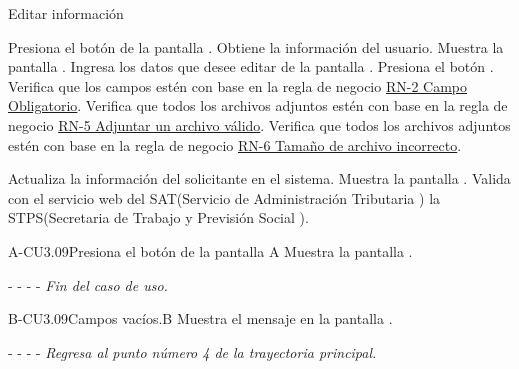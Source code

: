 	\begin{UCtrayectoria}{Editar información }

        \UCpaso[\UCactor]Presiona el botón  de la pantalla .
        \UCpaso[\UCsist] Obtiene la información del usuario.
		\UCpaso[\UCsist] Muestra la pantalla . 
		\UCpaso[\UCactor] Ingresa los datos que desee editar de la pantalla .
		\UCpaso[\UCactor] Presiona el botón . 
		\UCpaso[\UCsist] Verifica que los campos estén con base en la regla de negocio \hyperlink{RN2}{RN-2 Campo Obligatorio}. 
	    \UCpaso[\UCsist] Verifica que todos los archivos adjuntos estén con base en la regla de negocio \hyperlink{RN5}{RN-5 Adjuntar un archivo válido}. 
	    \UCpaso[\UCsist] Verifica que todos los archivos adjuntos estén con base en la regla de negocio \hyperlink{RN6}{RN-6 Tamaño de archivo incorrecto}. 
		
        \UCpaso[\UCsist] Actualiza la información del solicitante en el sistema.
	    \UCpaso[\UCsist] Muestra la pantalla .
	    \UCpaso[\UCsist] Valida con el servicio web del SAT(Servicio de Administración Tributaria ) la STPS(Secretaria de Trabajo y Previsión Social ).
	
	\end{UCtrayectoria}
	

	

	
	

	\begin{UCtrayectoriaA}{A-CU3.09}{Presiona el botón  de la pantalla }{A}
		\UCpaso[\UCsist] Muestra la pantalla .
		\item[- -] - - {\em Fin del caso de uso.} 
	\end{UCtrayectoriaA}

	\begin{UCtrayectoriaA}{B-CU3.09}{Campos vacíos.}{B}
	    \UCpaso[\UCsist]Muestra el mensaje en la pantalla .
	    \item[- -] - - {\em Regresa al punto número 4 de la trayectoria principal.}
	\end{UCtrayectoriaA}


